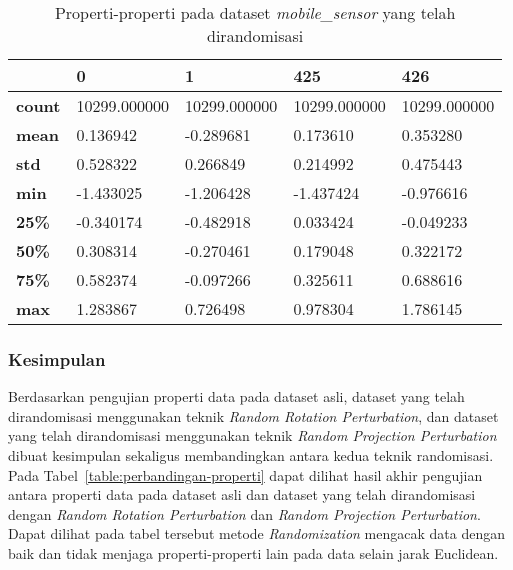 \begin{table}
	\centering
	\caption{Properti-properti pada dataset \textit{mobile\_sensor} yang telah dirandomisasi}
	\begin{tabular}{l|llll}
		\hline
		& 0 & 1 & 425 & 426 \\ \hline
		\textbf{count} & 10299.000000 & 10299.000000 & 10299.000000 & 10299.000000 \\
		\textbf{mean} & 0.136942 & -0.289681 & 0.173610 & 0.353280 \\
		\textbf{std} & 0.528322 & 0.266849 & 0.214992 & 0.475443 \\
		\textbf{min} & -1.433025 & -1.206428 & -1.437424 & -0.976616 \\
		\textbf{25\%} & -0.340174 & -0.482918 & 0.033424 & -0.049233 \\
		\textbf{50\%} & 0.308314 & -0.270461 & 0.179048 & 0.322172 \\
		\textbf{75\%} & 0.582374 & -0.097266 & 0.325611 & 0.688616 \\
		\textbf{max} & 1.283867 & 0.726498 & 0.978304 & 1.786145 \\
		\hline
	\end{tabular}
	\label{table:properti-mobile-sensor-asli}
\end{table}

\subsubsection{Kesimpulan}
\label{subsubsec:pengujian-properti-kesimpulan}

Berdasarkan pengujian properti data pada dataset asli, dataset yang telah dirandomisasi menggunakan teknik \textit{Random Rotation Perturbation}, dan dataset yang telah dirandomisasi menggunakan teknik \textit{Random Projection Perturbation} dibuat kesimpulan sekaligus membandingkan antara kedua teknik randomisasi. Pada Tabel~\ref{table:perbandingan-properti} dapat dilihat hasil akhir pengujian antara properti data pada dataset asli dan dataset yang telah dirandomisasi dengan \textit{Random Rotation Perturbation} dan \textit{Random Projection Perturbation}. Dapat dilihat pada tabel tersebut metode \textit{Randomization} mengacak data dengan baik dan tidak menjaga properti-properti lain pada data selain jarak Euclidean.

